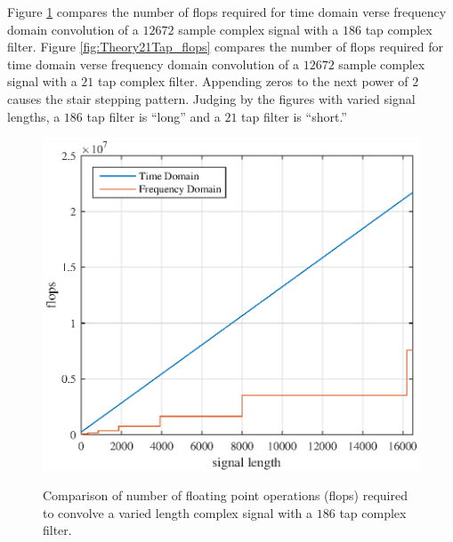 Figure \ref{fig:Theory186Tap_flops} compares the number of flops required for time domain verse frequency domain convolution of a $12672$ sample complex signal with a $186$ tap complex filter.
Figure \ref{fig:Theory21Tap_flops} compares the number of flops required for time domain verse frequency domain convolution of a $12672$ sample complex signal with a $21$ tap complex filter.
Appending zeros to the next power of $2$ causes the stair stepping pattern.
Judging by the figures with varied signal lengths, a $186$ tap filter is ``long'' and a $21$ tap filter is ``short.''
\begin{figure}
	\caption{Comparison of number of floating point operations (flops) required to convolve a varied length complex signal with a $186$ tap complex filter.}
	\centering\includegraphics[width=5in]{figures/gpu_intro/Theory186Tap_flops.eps}
	\label{fig:Theory186Tap_flops}
\end{figure}
